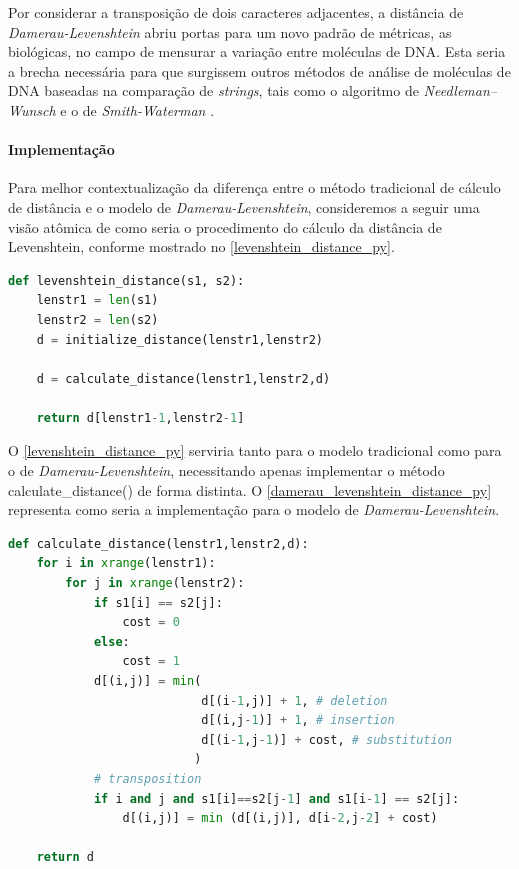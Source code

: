 Por  considerar  a transposição de dois caracteres adjacentes, a distância de \textit{Damerau-Levenshtein} abriu portas para um novo padrão de métricas, as biológicas, no campo de mensurar a variação entre moléculas de DNA. Esta seria a brecha necessária para que surgissem outros métodos de análise de moléculas de DNA baseadas na comparação de \textit{strings}, tais como o algoritmo de \textit{Needleman–Wunsch} \cite{needleman1970general} e  o de \textit{Smith-Waterman} \cite{smith1981identification}.

\paragraph*{Implementação} %
\label{sub:implementa_damerau_levenshtein}

Para melhor contextualização da diferença entre o método tradicional de cálculo de distância e o modelo de \textit{Damerau-Levenshtein}, consideremos a seguir uma visão atômica de como seria o procedimento do cálculo da distância de Levenshtein, conforme mostrado no \autoref{levenshtein_distance_py}.

\begin{lstlisting}[language=Python,label=levenshtein_distance_py,caption={Visão atômica do cálculo da distância de Levenshtein}]
def levenshtein_distance(s1, s2):
    lenstr1 = len(s1)
    lenstr2 = len(s2)
    d = initialize_distance(lenstr1,lenstr2)

	d = calculate_distance(lenstr1,lenstr2,d) 

    return d[lenstr1-1,lenstr2-1]
\end{lstlisting}

O \autoref{levenshtein_distance_py} serviria tanto para o modelo tradicional como para o de \textit{Damerau-Levenshtein}, necessitando apenas implementar o método {\code calculate\_distance()} de forma distinta. O \autoref{damerau_levenshtein_distance_py} representa como seria a implementação para o modelo de \textit{Damerau-Levenshtein}.

\begin{lstlisting}[language=Python,label=damerau_levenshtein_distance_py,caption={Implementação da distância de Damerau-Levenshtein}]
def calculate_distance(lenstr1,lenstr2,d):
    for i in xrange(lenstr1):
        for j in xrange(lenstr2):
            if s1[i] == s2[j]:
                cost = 0
            else:
                cost = 1
            d[(i,j)] = min(
                           d[(i-1,j)] + 1, # deletion
                           d[(i,j-1)] + 1, # insertion
                           d[(i-1,j-1)] + cost, # substitution
                          )
            # transposition
            if i and j and s1[i]==s2[j-1] and s1[i-1] == s2[j]:
                d[(i,j)] = min (d[(i,j)], d[i-2,j-2] + cost) 
 
    return d
\end{lstlisting}

